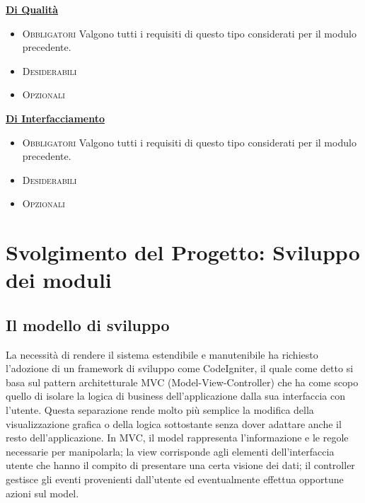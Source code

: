 \underline{\textbf{Di Qualit\`a}}
\begin{itemize}
 \item \textsc{Obbligatori}
Valgono tutti i requisiti di questo tipo considerati per il modulo precedente.
\item \textsc{Desiderabili}
\item \textsc{Opzionali}


\end{itemize}

\underline{\textbf{Di Interfacciamento}}
\begin{itemize}
 \item \textsc{Obbligatori}
      Valgono tutti i requisiti di questo tipo considerati per il modulo precedente.
	    
\item \textsc{Desiderabili}
\item \textsc{Opzionali}


\end{itemize}

\chapter{Svolgimento del Progetto: Sviluppo dei moduli}

\section{Il modello di sviluppo}
La necessit\`a di rendere il sistema estendibile e manutenibile ha richiesto l'adozione di un framework di sviluppo 
come CodeIgniter, il quale come detto si basa sul pattern architetturale MVC (Model-View-Controller) che ha come scopo
 quello di isolare la logica di business dell'applicazione dalla sua interfaccia con l'utente. Questa separazione rende 
molto pi\`u semplice la modifica della visualizzazione grafica o della logica sottostante senza dover adattare anche il
resto dell'applicazione. In MVC, il model rappresenta l'informazione e le regole necessarie per manipolarla;
 la view corrisponde agli elementi dell'interfaccia utente che hanno il compito di presentare una certa visione dei dati; 
il controller gestisce gli eventi provenienti dall'utente ed eventualmente effettua opportune azioni sul model.


